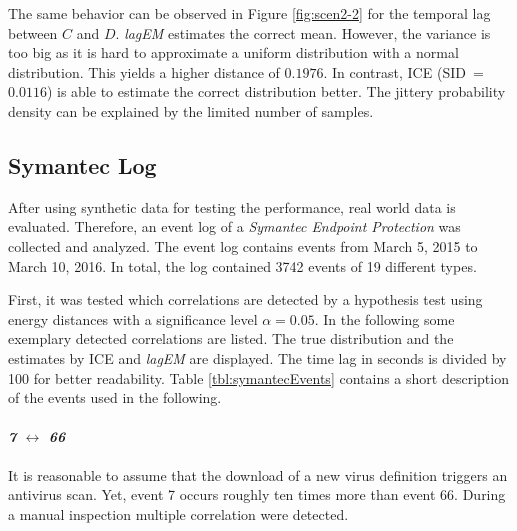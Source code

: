 \documentclass[conference]{IEEEtran}
\theoremstyle{examplestyle}
\begin{document}
The same behavior can be observed in Figure \ref{fig:scen2-2} for the temporal lag between \(C\) and \(D\). \textit{lagEM} estimates the correct mean. However, the variance is too big as it is hard to approximate a uniform distribution with a normal distribution. This yields a higher distance of $0.1976$. In contrast, \ac{ICE} (\ac{SID}~=~$0.0116$) is able to estimate the correct distribution better. The jittery probability density can be explained by the limited number of samples.









\subsection{Symantec Log}
\label{sec:symantecLog}

After using synthetic data for testing the performance, real world data is evaluated. Therefore, an event log of a \textit{Symantec Endpoint Protection} was collected and analyzed. The event log contains events from March 5, 2015 to March 10, 2016. In total, the log contained 3742 events of 19 different types.



First, it was tested which correlations are detected by a hypothesis test using energy distances with a significance level \(\alpha = 0.05\). In the following some exemplary detected correlations are listed. The true distribution and the estimates by \ac{ICE} and \textit{lagEM} are displayed. The time lag in seconds is divided by 100 for better readability. Table \ref{tbl:symantecEvents} contains a short description of the events used in the following.


\paragraph{\textit{7} \(\leftrightarrow\) \textit{66}} It is reasonable to assume that the download of a new virus definition triggers an antivirus scan. Yet, event 7 occurs roughly ten times more than event 66. During a manual inspection multiple correlation were detected.
\end{document}
